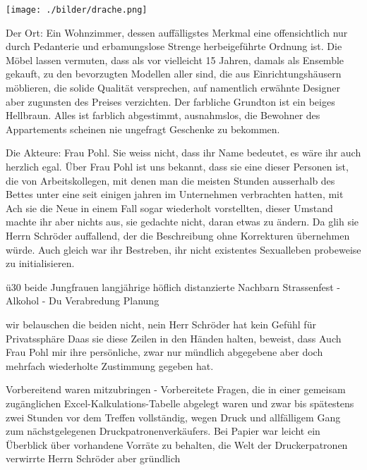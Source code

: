 ﻿\thispagestyle{empty}
\begin{center}
\texttt{[image: ./bilder/drache.png]}
\end{center}
\vspace*{\fill}
{\centering\fontsize{50}{48} \color{farbe}\par}
\newpage
\lettrine[lines=3, lhang=.2, loversize=.25, lraise=0.05, findent=0.1em,nindent=0em]{}{}

Der Ort: Ein Wohnzimmer, dessen auffälligstes Merkmal eine offensichtlich nur durch Pedanterie und erbamungslose Strenge herbeigeführte Ordnung ist. Die Möbel lassen vermuten, dass als vor vielleicht 15 Jahren, damals als Ensemble gekauft, zu den bevorzugten Modellen aller sind, die aus Einrichtungshäusern möblieren, die solide Qualität versprechen, auf namentlich erwähnte Designer aber zugunsten des Preises verzichten. Der farbliche Grundton ist ein beiges Hellbraun. Alles ist farblich abgestimmt, ausnahmslos, die Bewohner des Appartements scheinen nie ungefragt Geschenke zu bekommen.

Die Akteure:
Frau Pohl. Sie weiss nicht, dass ihr Name  bedeutet, es wäre ihr auch herzlich egal. Über Frau Pohl ist uns bekannt, dass sie eine dieser Personen ist, die von Arbeitskollegen, mit denen man die meisten Stunden ausserhalb des Bettes unter eine seit einigen jahren im Unternehmen verbrachten hatten, mit Ach sie die Neue in einem Fall sogar wiederholt vorstellten, dieser Umstand machte ihr aber nichts aus, sie gedachte nicht, daran etwas zu ändern. Da glih sie Herrn Schröder auffallend, der die Beschreibung ohne Korrekturen übernehmen würde. Auch gleich war ihr Bestreben, ihr nicht existentes Sexualleben probeweise zu initialisieren.

ü30
beide Jungfrauen
langjährige höflich distanzierte Nachbarn
Strassenfest - Alkohol - Du
Verabredung
Planung

wir belauschen die beiden nicht, nein Herr Schröder hat kein Gefühl für Privatssphäre
Daas sie diese Zeilen in den Händen halten, beweist, dass Auch Frau Pohl mir ihre persönliche, zwar nur mündlich abgegebene aber doch mehrfach wiederholte Zustimmung gegeben hat.

Vorbereitend waren mitzubringen
- Vorbereitete Fragen, die in einer gemeisam zugänglichen Excel-Kalkulations-Tabelle abgelegt waren und zwar bis spätestens zwei Stunden vor dem Treffen vollständig, wegen Druck und allfälligem Gang zum nächstgelegenen Druckpatronenverkäufers. Bei Papier war leicht ein Überblick über vorhandene Vorräte zu behalten, die Welt der Druckerpatronen verwirrte Herrn Schröder aber gründlich


